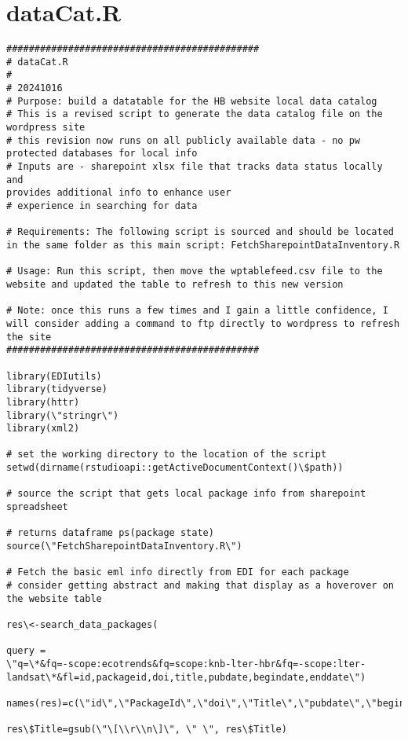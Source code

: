 \documentclass[
  letterpaper,
  DIV=11,
  numbers=noendperiod]{scrreprt}
\begin{document}
\section{dataCat.R}\label{datacat.r}

\begin{verbatim}
#############################################
# dataCat.R
#
# 20241016
# Purpose: build a datatable for the HB website local data catalog
# This is a revised script to generate the data catalog file on the
wordpress site
# this revision now runs on all publicly available data - no pw
protected databases for local info
# Inputs are - sharepoint xlsx file that tracks data status locally and
provides additional info to enhance user
# experience in searching for data

# Requirements: The following script is sourced and should be located
in the same folder as this main script: FetchSharepointDataInventory.R

# Usage: Run this script, then move the wptablefeed.csv file to the
website and updated the table to refresh to this new version

# Note: once this runs a few times and I gain a little confidence, I
will consider adding a command to ftp directly to wordpress to refresh
the site
#############################################

library(EDIutils)
library(tidyverse)
library(httr)
library(\"stringr\")
library(xml2)

# set the working directory to the location of the script
setwd(dirname(rstudioapi::getActiveDocumentContext()\$path))

# source the script that gets local package info from sharepoint
spreadsheet

# returns dataframe ps(package state)
source(\"FetchSharepointDataInventory.R\")

# Fetch the basic eml info directly from EDI for each package
# consider getting abstract and making that display as a hoverover on
the website table

res\<-search_data_packages(

query =
\"q=\*&fq=-scope:ecotrends&fq=scope:knb-lter-hbr&fq=-scope:lter-landsat\*&fl=id,packageid,doi,title,pubdate,begindate,enddate\")

names(res)=c(\"id\",\"PackageId\",\"doi\",\"Title\",\"pubdate\",\"begindate\",\"enddate\")

res\$Title=gsub(\"\[\\r\\n\]\", \" \", res\$Title)


\end{verbatim}
\end{document}
